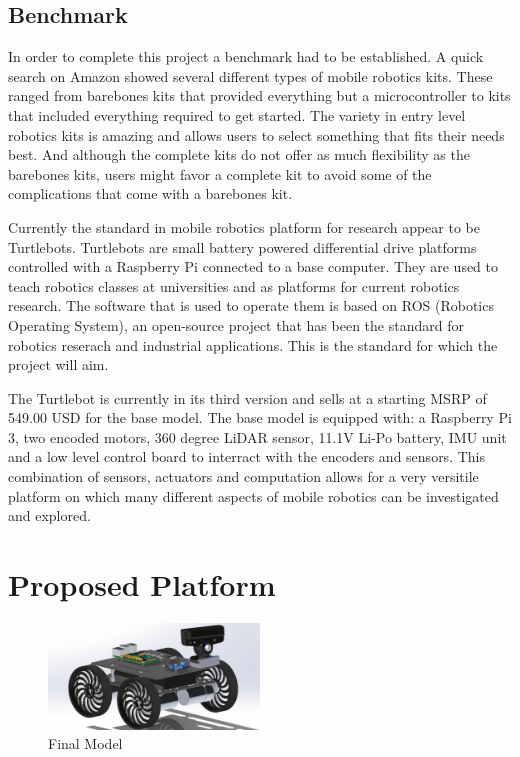 \documentclass[12pt, letterpaper,titlepage]{article}
\begin{document}
\subsection{Benchmark}

	In order to complete this project a benchmark had to be established. A quick search on Amazon showed several different types of mobile robotics kits. These ranged from barebones kits that provided everything but a microcontroller to kits that included everything required to get started. The variety in entry level robotics kits is amazing and allows users to select something that fits their needs best. And although the complete kits do not offer as much flexibility as the barebones kits, users might favor a complete kit to avoid some of the complications that come with a barebones kit. 

	Currently the standard in mobile robotics platform for research appear to be Turtlebots. Turtlebots are small battery powered differential drive platforms controlled with a Raspberry Pi connected to a base computer. They are used to teach robotics classes at universities and as platforms for current robotics research. The software that is used to operate them is based on ROS (Robotics Operating System), an open-source project that has been the standard for robotics reserach and industrial applications. This is the standard for which the project will aim.

	The Turtlebot is currently in its third version and sells at a starting MSRP of 549.00 USD for the base model. The base model is equipped with: a Raspberry Pi 3, two encoded motors, 360 degree LiDAR sensor, 11.1V Li-Po battery, IMU unit and a low level control board to interract with the encoders and sensors. This combination of sensors, actuators and computation allows for a very versitile platform on which many different aspects of mobile robotics can be investigated and explored.

\section{Proposed Platform}
	\begin{figure}[h]
		\includegraphics[width=0.5\textwidth]{final.png}
		\centering
		\caption{Final Model}
	\end{figure}
\end{document}
